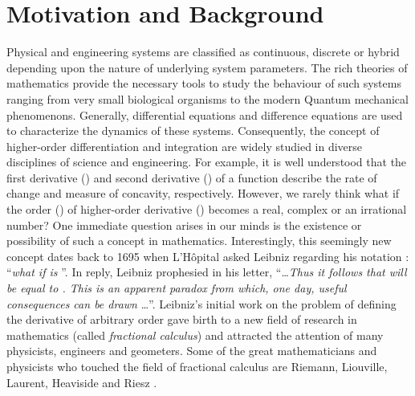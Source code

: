 \documentclass {llncs}
\begin{document}
\section{Motivation and Background}
Physical and engineering systems are classified as continuous, discrete or hybrid depending upon the
nature of underlying system parameters. The rich theories of mathematics provide the necessary tools to study the
behaviour of such systems ranging from very small biological organisms to the modern Quantum mechanical phenomenons.
Generally, differential equations \cite{math_modeling} and difference
equations \cite{diff_eq_book} are used to characterize the dynamics of
these systems. Consequently, the concept
of higher-order differentiation and integration are widely  studied in diverse disciplines of
 science and engineering. For example, it is well understood that the first derivative
() and
second derivative () of a function describe the rate of change and measure of concavity, respectively.
However, we rarely think what if the order () of higher-order derivative
 () becomes a real, complex or an irrational number?
 One immediate question arises in our
 minds is the existence or possibility of such a concept in mathematics. Interestingly, this seemingly new concept
 dates back to 1695 when L'H\^{o}pital asked Leibniz regarding his notation : ``{\em what if  is }''.
 In reply, Leibniz \cite{Le_1} prophesied in his letter,
 ``\ldots \textit{Thus it follows that  will be equal to . This is an apparent paradox from which, one
 day, useful consequences can be drawn} \ldots''.
Leibniz's initial work
on the problem of defining the derivative of arbitrary order
gave birth to a new field of research in mathematics (called \textit{fractional calculus}) and
attracted the attention of many  physicists, engineers
and geometers. Some of the  great mathematicians
and physicists who touched the field of fractional calculus
are Riemann, Liouville, Laurent, Heaviside and  Riesz \cite{B2_93}.
\end{document}
